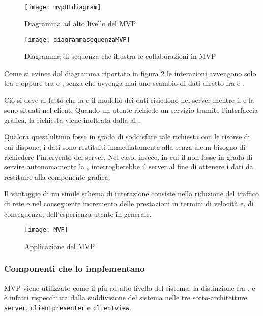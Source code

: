 \begin{figure}[H]
  \centering
  \texttt{[image: mvpHLdiagram]}
  \caption{Diagramma ad alto livello del  MVP}\label{fig:mvpHL}
\end{figure}

\begin{figure}[H]
  \centering
  \texttt{[image: diagrammasequenzaMVP]}
  \caption{Diagramma di sequenza che illustra le collaborazioni in MVP}\label{fig:mvpSD}
\end{figure}

Come si evince dal diagramma riportato in figura \ref{fig:mvpSD} le interazioni avvengono solo tra  e  oppure tra  e , senza che avvenga mai uno scambio di dati diretto fra  e .

Ciò si deve al fatto che la  e il modello dei dati risiedono nel server mentre il  e la  sono situati nel client. Quando un utente richiede un servizio tramite l'interfaccia grafica, la richiesta viene inoltrata dalla  al .

Qualora quest'ultimo fosse in grado di soddisfare tale richiesta con le risorse di cui dispone, i dati sono restituiti immediatamente alla  senza alcun bisogno di richiedere l'intervento del server. Nel caso, invece, in cui il  non fosse in grado di servire autonomamente la , interrogherebbe il server al fine di ottenere i dati da restituire alla componente grafica.

Il vantaggio di un simile schema di interazione consiste nella riduzione del traffico di rete e nel conseguente incremento delle prestazioni in termini di velocità e, di conseguenza, dell'esperienza utente in generale.


\begin{figure}[H]
  \centering
  \texttt{[image: MVP]}
  \caption{Applicazione del  MVP}\label{fig:mvp}
\end{figure}


\subsubsection{Componenti che lo implementano}
MVP viene utilizzato come il  più ad alto livello del sistema: la distinzione fra ,  e  è infatti rispecchiata dalla suddivisione del sistema nelle tre sotto-architetture \texttt{server}, \texttt{clientpresenter} e \texttt{clientview}.

